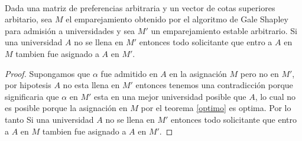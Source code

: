 \begin{lem} 
\label{lema rural} 
\cite{Verde} \\
Dada una matriz de preferencias arbitraria y un vector de cotas superiores arbitario, sea $M$ el emparejamiento obtenido por el algoritmo de Gale Shapley para admisión a universidades y sea $M'$ un emparejamiento estable arbitrario. Si una universidad $A$ no se llena en $M'$ entonces todo solicitante que entro a $A$ en $M$ tambien fue asignado a $A$ en $M'$. 
\end{lem}
\begin{proof}
Supongamos que $\alpha$ fue admitido en $A$ en la asignación $M$ pero no en $M'$, por hipotesis $A$ no esta llena en $M'$ entonces tenemos una contradicción porque significaria que $\alpha$  en $M'$ esta en una mejor universidad posible que $A$, lo cual no es posible porque la asignación en $M$ por el teorema \ref{optimo} es optima. Por lo tanto  Si una universidad $A$ no se llena en $M'$ entonces todo solicitante que entro a $A$ en $M$ tambien fue asignado a $A$ en $M'$. 
\end{proof}


